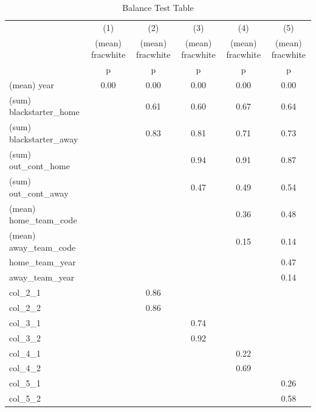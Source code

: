 \begin{table}[htbp]\centering
\def\sym#1{\ifmmode^{#1}\else\(^{#1}\)\fi}
\caption{Balance Test Table \label{tab1}}
\begin{tabular}{l*{5}{c}}
\hline\hline
                    &\multicolumn{1}{c}{(1)}&\multicolumn{1}{c}{(2)}&\multicolumn{1}{c}{(3)}&\multicolumn{1}{c}{(4)}&\multicolumn{1}{c}{(5)}\\
                    &\multicolumn{1}{c}{(mean) fracwhite}&\multicolumn{1}{c}{(mean) fracwhite}&\multicolumn{1}{c}{(mean) fracwhite}&\multicolumn{1}{c}{(mean) fracwhite}&\multicolumn{1}{c}{(mean) fracwhite}\\
                    &           p&           p&           p&           p&           p\\
\hline
(mean) year         &        0.00&        0.00&        0.00&        0.00&        0.00\\
(sum) blackstarter\_home&            &        0.61&        0.60&        0.67&        0.64\\
(sum) blackstarter\_away&            &        0.83&        0.81&        0.71&        0.73\\
(sum) out\_cont\_home &            &            &        0.94&        0.91&        0.87\\
(sum) out\_cont\_away &            &            &        0.47&        0.49&        0.54\\
(mean) home\_team\_code&            &            &            &        0.36&        0.48\\
(mean) away\_team\_code&            &            &            &        0.15&        0.14\\
home\_team\_year      &            &            &            &            &        0.47\\
away\_team\_year      &            &            &            &            &        0.14\\
\hline
col\_2\_1             &            &        0.86&            &            &            \\
col\_2\_2             &            &        0.86&            &            &            \\
col\_3\_1             &            &            &        0.74&            &            \\
col\_3\_2             &            &            &        0.92&            &            \\
col\_4\_1             &            &            &            &        0.22&            \\
col\_4\_2             &            &            &            &        0.69&            \\
col\_5\_1             &            &            &            &            &        0.26\\
col\_5\_2             &            &            &            &            &        0.58\\
\hline\hline
\end{tabular}
\end{table}
